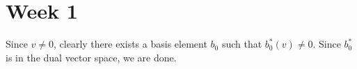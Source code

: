 \section{Week 1}

Since $v \neq 0$, clearly there exists a basis element $b_0$ such that $b_0^{\ast}(v) \neq 0$. Since $b_0^{\ast}$ is in the dual vector space, we are done.